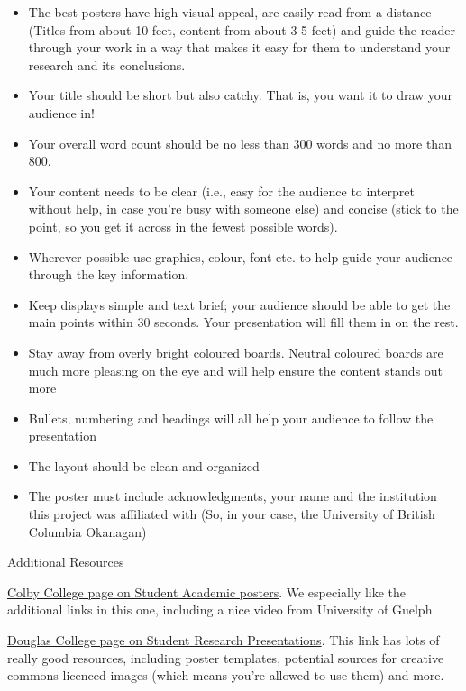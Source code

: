 \documentclass[
]{book}
\providecommand{\tightlist}{%
  \setlength{\itemsep}{0pt}\setlength{\parskip}{0pt}}
\begin{document}
\begin{itemize}
\tightlist
\item
  The best posters have high visual appeal, are easily read from a distance (Titles from about 10 feet, content from about 3-5 feet) and guide the reader through your work in a way that makes it easy for them to understand your research and its conclusions.
\item
  Your title should be short but also catchy. That is, you want it to draw your audience in!
\item
  Your overall word count should be no less than 300 words and no more than 800.
\item
  Your content needs to be clear (i.e., easy for the audience to interpret without help, in case you're busy with someone else) and concise (stick to the point, so you get it across in the fewest possible words).
\item
  Wherever possible use graphics, colour, font etc. to help guide your audience through the key information.
\item
  Keep displays simple and text brief; your audience should be able to get the main points within 30 seconds. Your presentation will fill them in on the rest.
\item
  Stay away from overly bright coloured boards. Neutral coloured boards are much more pleasing on the eye and will help ensure the content stands out more
\item
  Bullets, numbering and headings will all help your audience to follow the presentation
\item
  The layout should be clean and organized
\item
  The poster must include acknowledgments, your name and the institution this project was affiliated with (So, in your case, the University of British Columbia Okanagan)
\end{itemize}

Additional Resources

\href{http://www.colby.edu/acits/student-academic-poster-guidelines/}{Colby College page on Student Academic posters}. We especially like the additional links in this one, including a nice video from University of Guelph.

\href{https://guides.douglascollege.ca/ResearchPoster}{Douglas College page on Student Research Presentations}. This link has lots of really good resources, including poster templates, potential sources for creative commons-licenced images (which means you're allowed to use them) and more.
\end{document}
